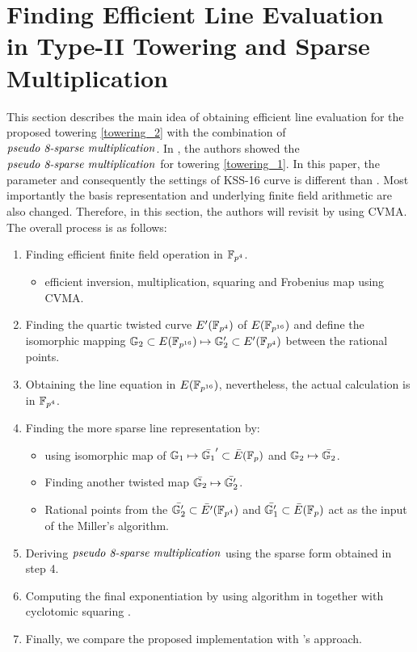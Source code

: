 \section{Finding Efficient Line Evaluation in Type-II Towering and Sparse Multiplication}
\label{sec:3}
This section describes the main idea of obtaining efficient line evaluation for the proposed towering \eqref{towering_2} with the combination of $\textit{pseudo 8-sparse multiplication}$.
In \cite{INDOCRYPT:KNGDNK17}, the authors showed the $\textit{pseudo 8-sparse multiplication}$ for towering \eqref{towering_1}. 
In this paper, the parameter and consequently the settings of KSS-16 curve is different than \cite{INDOCRYPT:KNGDNK17}. 
Most importantly the basis representation and underlying finite field arithmetic are also changed. 
Therefore, in this section, the authors will revisit \cite{INDOCRYPT:KNGDNK17} by using CVMA.
The overall process is as follows:
\begin{enumerate}
	\item Finding efficient finite field operation in $\mathbb{F}_{p^4}$.
	\begin{itemize}
		\item efficient  inversion, multiplication, squaring and Frobenius map using CVMA.
	\end{itemize}
	\item Finding the quartic twisted curve $E'(\mathbb{F}_{p^4})$ of $E(\mathbb{F}_{p^{16}})$ and define the isomorphic mapping ${\mathbb{G}}_{2} \subset E(\mathbb{F}_{p^{16}}) \mapsto {\mathbb{G}}_{2}' \subset E'(\mathbb{F}_{p^4})$ between the rational points.
	\item Obtaining the line equation in $E(\mathbb{F}_{p^{16}})$, nevertheless, the actual calculation is in $\mathbb{F}_{p^4}$.
	\item Finding the more sparse line representation by:
		\begin{itemize}
		\item using isomorphic map of ${\mathbb{G}}_{1} \mapsto \bar{{\mathbb{G}}_{1}}' \subset \bar{E}(\mathbb{F}_p)$ and ${\mathbb{G}}_{2} \mapsto \bar{{\mathbb{G}}_{2}}$.
		\item Finding another twisted map $\bar{{\mathbb{G}}_{2}} \mapsto \bar{{\mathbb{G}}_{2}'}$. 
		\item Rational points from the $\bar{{\mathbb{G}}_{2}'} \subset \bar{E'}(\mathbb{F}_{p^4})$  and $\bar{{\mathbb{G}}_{1}'} \subset \bar{E}(\mathbb{F}_p)$ act as the input of the Miller's algorithm.
	\end{itemize}
	\item Deriving $\textit{pseudo 8-sparse multiplication}$ using the sparse form obtained in step 4.
	\item Computing the final exponentiation by using algorithm in \cite{EPRINT:GhaFou16b} together with cyclotomic squaring \cite{PKC:GraSco10}.
	\item  Finally, we compare the proposed implementation with \cite{INDOCRYPT:KNGDNK17}'s approach.
\end{enumerate}
